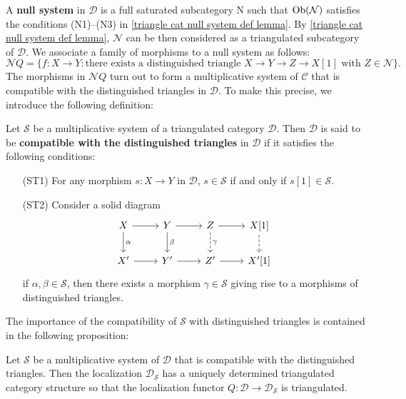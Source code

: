 A \textbf{null system} in $\mathcal{D}$ is a full saturated subcategory N such that $\mathrm{Ob}(\mathcal{N})$ satisfies the conditions (N1)--(N3) in \cref{triangle cat null system def lemma}. By \cref{triangle cat null system def lemma}, $\mathcal{N}$ can be then considered as a triangulated subcategory of $\mathcal{D}$. We associate a family of morphisms to a null system as follows:
\begin{equation}\label{triangle cat null system associated multiplicative system-1}
\mathcal{N}Q=\{f:X\to Y:\text{there exists a distinguished triangle $X\to Y\to Z\to X[1]$ with $Z\in\mathcal{N}$}\}.
\end{equation}
The morphisms in $\mathcal{N}Q$ turn out to form a multiplicative system of $\mathcal{C}$ that is compatible with the distinguished triangles in $\mathcal{D}$. To make this precise, we introduce the following definition:
\begin{definition}
Let $\mathcal{S}$ be a multiplicative system of a triangulated category $\mathcal{D}$. Then $\mathcal{D}$ is said to be \textbf{compatible with the distinguished triangles} in $\mathcal{D}$ if it satisfies the following conditions:
\begin{enumerate}[leftmargin=40pt]
    \item[(ST1)] For any morphism $s:X\to Y$ in $\mathcal{D}$, $s\in\mathcal{S}$ if and only if $s[1]\in\mathcal{S}$.
    \item[(ST2)] Consider a solid diagram
    \[\begin{tikzcd}
    X\ar[r]\ar[d,"\alpha"]&Y\ar[r]\ar[d,"\beta"]&Z\ar[r]\ar[d,dashed,"\gamma"]&X[1]\ar[d,dashed]\\
    X'\ar[r]&Y'\ar[r]&Z'\ar[r]&X'[1]
    \end{tikzcd}\]
    if $\alpha,\beta\in\mathcal{S}$, then there exists a morphism $\gamma\in\mathcal{S}$ giving rise to a morphisms of distinguished triangles.
\end{enumerate}
\end{definition}
The importance of the compatibility of $\mathcal{S}$ with distinguished triangles is contained in the following proposition:
\begin{proposition}\label{triangle cat localization by compatible multiplicative system}
Let $\mathcal{S}$ be a multiplicative system of $\mathcal{D}$ that is compatible with the distinguished triangles. Then the localization $\mathcal{D}_\mathcal{S}$ has a uniquely determined triangulated category structure so that the localization functor $Q:\mathcal{D}\to\mathcal{D}_\mathcal{S}$ is triangulated.
\end{proposition}
